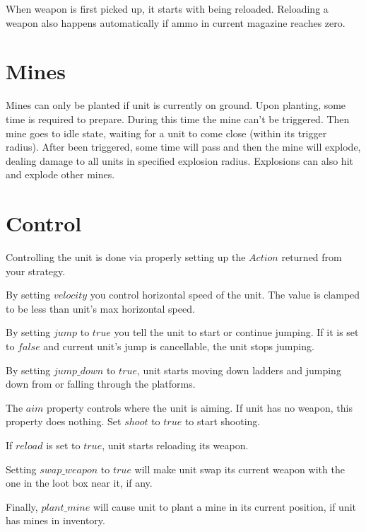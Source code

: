 When weapon is first picked up, it starts with being reloaded.
Reloading a weapon also happens automatically if ammo in current magazine reaches zero.

\section{Mines}

Mines can only be planted if unit is currently on ground.
Upon planting, some time is required to prepare. During this time the mine can't be triggered.
Then mine goes to idle state, waiting for a unit to come close (within its trigger radius).
After been triggered, some time will pass and then the mine will explode, dealing damage to all units in specified explosion radius.
Explosions can also hit and explode other mines.

\section{Control}

Controlling the unit is done via properly setting up the $Action$ returned from your strategy.

By setting $velocity$ you control horizontal speed of the unit. The value is clamped to be less than unit's max horizontal speed.

By setting $jump$ to $true$ you tell the unit to start or continue jumping.
If it is set to $false$ and current unit's jump is cancellable, the unit stops jumping.

By setting $jump\_down$ to $true$, unit starts moving down ladders and jumping down from or falling through the platforms.

The $aim$ property controls where the unit is aiming. If unit has no weapon, this property does nothing.
Set $shoot$ to $true$ to start shooting.

If $reload$ is set to $true$, unit starts reloading its weapon.

Setting $swap\_weapon$ to $true$ will make unit swap its current weapon with the one in the loot box near it, if any.

Finally, $plant\_mine$ will cause unit to plant a mine in its current position, if unit has mines in inventory.